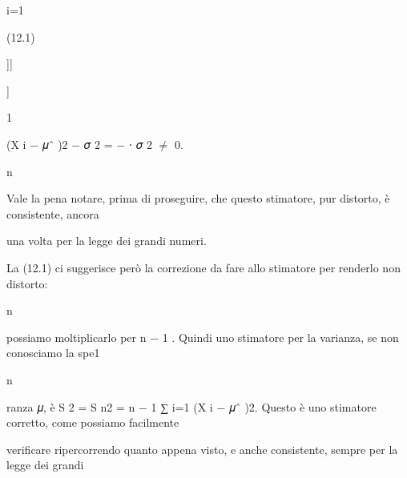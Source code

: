 \documentclass[a4paper,portrait,12pt]{article}
\begin{document}
\begin{flushleft}
i=1
\end{flushleft}





(12.1)





]]


]





1


\begin{flushleft}
(X i $-$ 𝜇ˆ )2 $-$ 𝜎 2 = $-$ ⋅ 𝜎 2 $\neq$ 0.
\end{flushleft}


\begin{flushleft}
n
\end{flushleft}





\begin{flushleft}
Vale la pena notare, prima di proseguire, che questo stimatore, pur distorto, \`{e} consistente, ancora
\end{flushleft}


\begin{flushleft}
una volta per la legge dei grandi numeri.
\end{flushleft}


\begin{flushleft}
La (12.1) ci suggerisce per\`{o} la correzione da fare allo stimatore per renderlo non distorto:
\end{flushleft}


\begin{flushleft}
n
\end{flushleft}


\begin{flushleft}
possiamo moltiplicarlo per n $-$ 1 . Quindi uno stimatore per la varianza, se non conosciamo la spe1
\end{flushleft}


\begin{flushleft}
n
\end{flushleft}


\begin{flushleft}
ranza 𝜇, \`{e} S 2 = S n2 = n $-$ 1 ∑ i=1 (X i $-$ 𝜇ˆ )2. Questo \`{e} uno stimatore corretto, come possiamo facilmente
\end{flushleft}


\begin{flushleft}
verificare ripercorrendo quanto appena visto, e anche consistente, sempre per la legge dei grandi
\end{flushleft}
\end{document}
